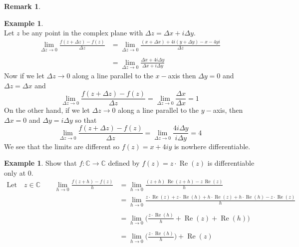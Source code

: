 \documentclass[11pt,a4paper]{article}
\theoremstyle{definition}
\newtheorem{example}[thm]{Example}
\newtheorem{remark}[thm]{Remark}
\begin{document}
\begin{remark}
\begin{example}
\text{\textcolor{red}{Solution}}\\
Let $z$ be any point in the complex plane with $\Delta z = \Delta x + i\Delta y$.
\begin{align*}
\lim\limits_{\Delta z \rightarrow 0} \frac{f(z + \Delta z ) - f(z)}{\Delta z } & = \lim\limits_{\Delta z \rightarrow 0}\frac{(x + \Delta x) + 4i(y + \Delta y ) - x - 4yi}{\Delta z}\\\\
& = \lim\limits_{\Delta z \rightarrow 0}\frac{\Delta x + 4i \Delta y}{\Delta x + i \Delta y}
\end{align*}
Now if we let $\Delta z \longrightarrow 0$ along a line parallel to the $x-$axis then $\Delta  y = 0$ and $\Delta z = \Delta x$ and
$$\lim\limits_{\Delta z \rightarrow 0} \frac{f(z + \Delta z ) - f(z)}{\Delta z } = \lim\limits_{\Delta z \rightarrow 0} \frac{\Delta x}{\Delta x} = 1$$
On the other hand, if we let $\Delta z \longrightarrow 0$ along a line parallel to the $y-$axis, then $\Delta x =0$ and $\Delta y = i\Delta y$ so that
$$\lim\limits_{\Delta z \rightarrow 0} \frac{f(z + \Delta z ) - f(z)}{\Delta z } = \lim\limits_{\Delta z \rightarrow 0}\frac{4i\Delta y }{i\Delta y } = 4$$
We see that the limits are different so $f(z) = x + 4iy$ is nowhere differentiable.
\end{example}

\begin{example}
Show that $f: \mathbb{C}\longrightarrow \mathbb{C}$ defined by $f(z) = z\cdot \operatorname{Re}(z)$ is differentiable only at 0.\\

\text{\textcolor{red}{Solution}}
\begin{align*}
\text{Let}\quad  z \in \mathbb{C}\qquad  \lim\limits_{h\rightarrow 0} \frac{f(z + h) - f(z)}{h} & = \lim\limits_{h\rightarrow 0}\frac{(z + h)\,\operatorname{Re}(z + h) - z\, \operatorname{Re}(z)}{h}\\
& = \lim\limits_{h\rightarrow 0}\frac{z\cdot \operatorname{Re}(z) + z\cdot \operatorname{Re}(h) + h\cdot \operatorname{Re}(z) + h\cdot \operatorname{Re}(h) - z\cdot \operatorname{Re}(z)}{h}\\\\
& = \lim\limits_{h\rightarrow 0}\Big(\frac{z\cdot \operatorname{Re}(h)}{h} + \operatorname{Re}(z) + \operatorname{Re}(h)\Big)\\\\
& = \lim\limits_{h\rightarrow 0}\Big(\frac{z\cdot \operatorname{Re}(h)}{h}\Big) + \operatorname{Re}(z)
\end{align*}


\end{example}
\end{remark}
\end{document}
